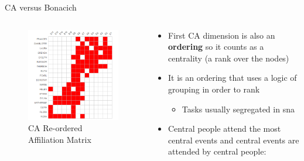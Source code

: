\documentclass[
  ignorenonframetext,
]{beamer}
\providecommand{\tightlist}{%
  \setlength{\itemsep}{0pt}\setlength{\parskip}{0pt}}\usepackage{longtable,booktabs,array}
\begin{document}
\begin{frame}{CA versus Bonacich}
\protect\hypertarget{ca-versus-bonacich-12}{}
\begin{columns}[T]
\begin{column}{0.5\textwidth}
\begin{figure}

{\centering \includegraphics{Plots/ca-reord.png}

}

\caption{CA Re-ordered Affiliation Matrix}

\end{figure}
\end{column}

\begin{column}{0.5\textwidth}
\begin{itemize}
\tightlist
\item
  First CA dimension is also an \textbf{ordering} so it counts as a
  centrality (a rank over the nodes)
\item
  It is an ordering that uses a logic of grouping in order to rank

  \begin{itemize}
  \tightlist
  \item
    Tasks usually segregated in sna
  \end{itemize}
\item
  Central people attend the most central events and central events are
  attended by central people:


\end{itemize}
\end{column}
\end{columns}
\end{frame}
\end{document}
